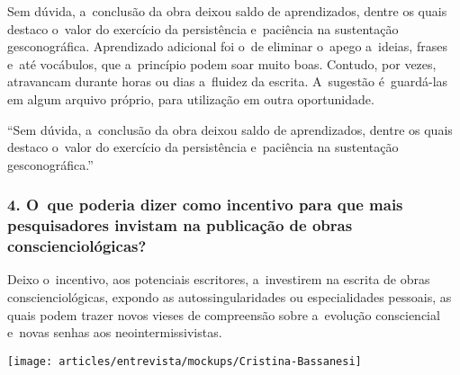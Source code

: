 \documentclass{gescons}
\begin{document}
\begin{multicols}{2}
Sem dúvida, a~conclusão da obra deixou saldo de aprendizados, dentre os quais destaco o~valor do exercício da persistência e~paciência na sustentação gesconográfica. Aprendizado adicional foi o~de eliminar o~apego a~ideias, frases e~até vocábulos, que a~princípio podem soar muito boas. Contudo, por vezes, atravancam durante horas ou dias a~fluidez da escrita. A~sugestão é~guardá-las em algum arquivo próprio, para utilização em outra oportunidade. 

\begin{pullquote}
``Sem dúvida, a~conclusão da obra deixou saldo de aprendizados, dentre os quais destaco o~valor do exercício da persistência e~paciência na sustentação gesconográfica.''
\end{pullquote}

\subsubsection{4. O~que poderia dizer como incentivo para que mais pesquisadores invistam na publicação de obras conscienciológicas?}

Deixo o~incentivo, aos potenciais escritores, a~investirem na escrita de obras conscienciológicas, expondo as autossingularidades ou especialidades pessoais, as quais podem trazer novos vieses de compreensão sobre a~evolução consciencial e~novas senhas aos neointermissivistas. 


\begin{center}
    \texttt{[image: articles/entrevista/mockups/Cristina-Bassanesi]}
\end{center}
    
    \end{multicols}
\end{document}
